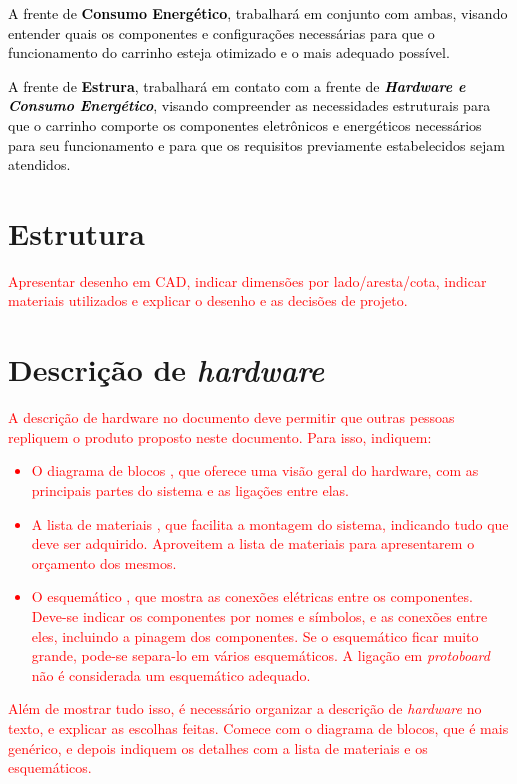 \textcolor{black}{A frente de \textbf{Consumo Energético}, trabalhará em conjunto com ambas, visando entender quais os componentes e configurações necessárias para que o funcionamento do carrinho esteja otimizado e o mais adequado possível.}

\textcolor{black}{A frente de \textbf{Estrura}, trabalhará em contato com a frente de \textbf{\textit{Hardware e Consumo Energético}}, visando compreender as necessidades estruturais para que o carrinho comporte os componentes eletrônicos e energéticos necessários para seu funcionamento e para que os requisitos previamente estabelecidos sejam atendidos.}

\section{Estrutura}

\textcolor{red}{Apresentar desenho em CAD, indicar dimensões por lado/aresta/cota, indicar materiais utilizados e explicar o desenho e as decisões de projeto.}

\section{Descrição de \textit{hardware}}

\textcolor{red}{A descrição de hardware no documento deve permitir que outras pessoas repliquem o produto proposto neste documento. Para isso, indiquem:}

\textcolor{red}{\begin{itemize}
    \item O diagrama de blocos \cite{blockdiagram}, que oferece uma visão geral do hardware, com as principais partes do sistema e as ligações entre elas.
    \item A lista de materiais \cite{bom}, que facilita a montagem do sistema, indicando tudo que deve ser adquirido. Aproveitem a lista de materiais para apresentarem o orçamento dos mesmos.
    \item O esquemático \cite{esquematico}, que mostra as conexões elétricas entre os componentes. Deve-se indicar os componentes por nomes e símbolos, e as conexões entre eles, incluindo a pinagem dos componentes. Se o esquemático ficar muito grande, pode-se separa-lo em vários esquemáticos. A ligação em \textit{protoboard} não é considerada um esquemático adequado.
\end{itemize}}

\textcolor{red}{Além de mostrar tudo isso, é necessário organizar a descrição de \textit{hardware} no texto, e explicar as escolhas feitas. Comece com o diagrama de blocos, que é mais genérico, e depois indiquem os detalhes com a lista de materiais e os esquemáticos.}

